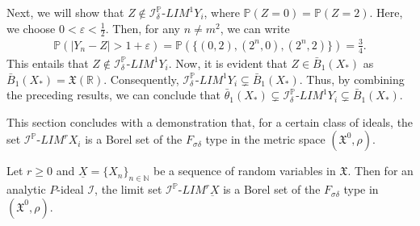 \documentclass[reqno]{amsart}
\begin{document}
\begin{example}
Next, we will show that $Z\notin \mathcal{I}_{\delta}^{\mathbb{P}}$-$LIM^{1}Y_i$, where $\mathbb{P}(Z=0)=\mathbb{P}(Z=2)$. Here, we choose $0<\varepsilon<\frac{1}{2}$. Then, for any $n\neq m^2$, we can write
\begin{align*}
\mathbb{P}(|Y_n-Z|>1+\varepsilon)=\mathbb{P}(\{(0,2),(2^n,0),(2^n,2)\})=\frac{3}{4}.
\end{align*}
This entails that $Z\notin \mathcal{I}_{\delta}^{\mathbb{P}}$-$LIM^{1}Y_i$. Now, it is evident that $Z\in \bar{B}_1(X_*)$ as $\bar{B}_1(X_*)=\mathfrak{X}(\mathbb{R})$. Consequently,  $\mathcal{I}_{\delta}^{\mathbb{P}}$-$LIM^{1}Y_i\subsetneq \bar{B}_1(X_*)$. Thus,  by combining the preceding results, we can conclude that $\bar{\theta}_1(X_*)\subsetneq\mathcal{I}_{\delta}^{\mathbb{P}}$-$LIM^{1}Y_i\subsetneq \bar{B}_1(X_*)$.
\end{example}
This section concludes with a demonstration that, for a certain class of ideals,  the set $\mathcal{I}^{\mathbb{P}}$-$LIM^rX_i$ is a Borel set of the  $F_{\sigma\delta}$ type in the metric space $(\mathfrak{X^0},\rho)$.
\begin{theorem}\label{theo1}
Let $r\geq 0$ and $\underline{X}=\{X_n\}_{n\in\mathbb{N}}$ be a sequence of random variables in  $\mathfrak{X}$. Then
for an analytic $P$-ideal $\mathcal{I}$, the limit set $\mathcal{I}^{\mathbb{P}}$-$LIM^r\underbar{X}$  is a Borel set of the  $F_{\sigma\delta}$ type in $(\mathfrak{X^0},\rho)$.
\end{theorem}
\end{document}

